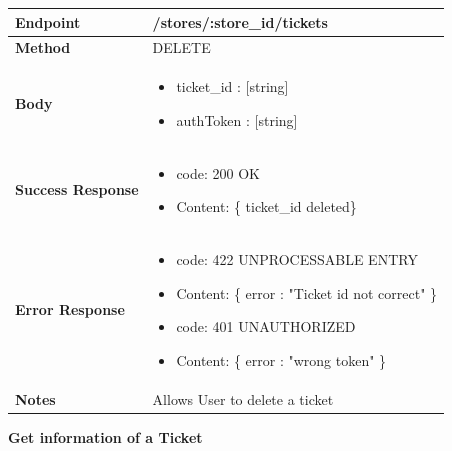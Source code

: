 \documentclass[a4paper, 12pt, oneside, table]{article}
\begin{document}
\begin{tabularx}{\linewidth}{| l | X |}
    
    \hline
     \textbf{Endpoint} & /stores/:store\_id/tickets \\
    

    \hline
    \textbf{Method}  & DELETE   \\
    
    \hline
    \textbf{Body}  & \parbox{0.7\textwidth}{ \begin{itemize}[label={}] 
                \item ticket\_id : [string]
                 \item authToken : [string]
               \end{itemize}}\\
    
    \hline
    \textbf{Success Response} & \parbox{0.7\textwidth}{ \begin{itemize}[label={}] 
                \item code: 200 OK
                 \item Content: \{ ticket\_id deleted\}
               \end{itemize}}\\
    
    \hline
    
    \hline
        \textbf{Error Response} & \parbox{0.7\textwidth}{ \begin{itemize}[label={}] 
                \item code: 422 UNPROCESSABLE ENTRY
                 \item Content: \{ error : "Ticket id not correct" \}
                  \item code: 401 UNAUTHORIZED
                 \item Content: \{ error : "wrong token" \}
               \end{itemize}}\\
    
    \hline
    \textbf{Notes} & Allows User to delete a ticket \\

    \hline
    
\end{tabularx}

\textbf{Get information of a Ticket}
\vspace{-2em}
\begin{tabularx}{0.8\textwidth} { 
  | >{\raggedright\arraybackslash}X 
  | >{\centering\arraybackslash}X 
  | >{\raggedleft\arraybackslash}X | }
 \hline

 \hline
 
\hline
\hline
 
\hline
\end{tabularx}
\end{document}
